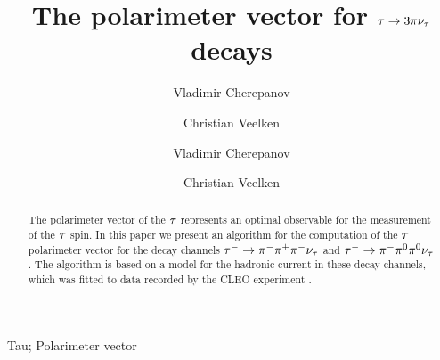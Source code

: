 \ifx\ver\verPAPER
\begin{frontmatter}
\fi

\title{The polarimeter vector for $\tau \to 3 \pi\nu_{\tau}$ decays}
\ifx\ver\verPreprint
\author[1]{Vladimir Cherepanov}
\author[2]{Christian Veelken}
\fi
\ifx\ver\verPAPER
\author[a]{Vladimir Cherepanov}
\author[b]{Christian Veelken}
\address[a]{University of Florida, Department of Physics,  Gainesville, FL, 32611 - 8440, USA }
\address[b]{National Institute of Chemical Physics and Biophysics (NICPB), R\"{a}vala pst 10, 10143 Tallinn, Estonia}
\fi

\ifx\ver\verPreprint
\maketitle
\fi

\begin{abstract}
The polarimeter vector of the $\tau$ represents an optimal observable for the measurement of the $\tau$ spin. 
In this paper we present an algorithm for the computation of the $\tau$ polarimeter vector for the decay channels $\tau^{-} \to \pi^{-}\pi^{+}\pi^{-}\nu_{\tau}$ and $\tau^{-} \to \pi^{-}\pi^{\textrm{0}}\pi^{\textrm{0}}\nu_{\tau}$.
The algorithm is based on a model for the hadronic current in these decay channels, which was fitted to data recorded by the CLEO experiment
\cite{CLEO:1999rzk}.
\end{abstract}

\ifx\ver\verPAPER
\begin{keyword}
Tau; Polarimeter vector
\end{keyword}
\end{frontmatter}
\fi

\ifx\ver\verPAPER
\linenumbers
\fi


